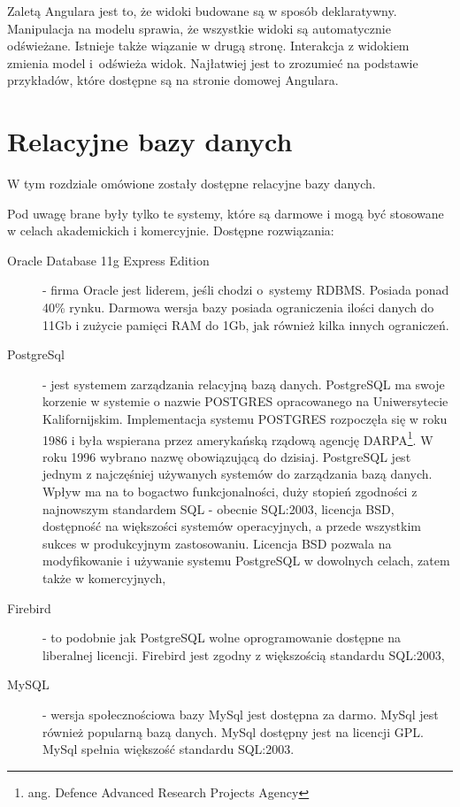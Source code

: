 \documentclass[a4paper,onecolumn,oneside,11pt,wide,floatssmall]{mwrep}
\theoremstyle{definition}
\theoremstyle{plain}%
\theoremstyle{remark}
\begin{document}
Zaletą Angulara jest to, że widoki budowane są w sposób deklaratywny. Manipulacja na modelu sprawia, że wszystkie widoki są automatycznie odświeżane. Istnieje także wiązanie w drugą stronę. Interakcja z widokiem zmienia model \mbox{i odświeża} widok. Najłatwiej jest to zrozumieć na podstawie przykładów, które dostępne są na stronie domowej Angulara.

\section{Relacyjne bazy danych}
W tym rozdziale omówione zostały dostępne relacyjne bazy danych.

Pod uwagę brane były tylko te systemy, które są darmowe i mogą być stosowane w celach akademickich i komercyjnie.
Dostępne rozwiązania:
\begin{description}
  \item [Oracle Database 11g Express Edition] - firma Oracle jest liderem, jeśli chodzi \mbox{o systemy} RDBMS. Posiada ponad 40\% rynku. Darmowa wersja bazy posiada ograniczenia ilości danych do 11Gb i zużycie pamięci RAM do 1Gb, jak również kilka innych ograniczeń. 
  \item [PostgreSql]  \cite{postgreSQLHome} - jest systemem zarządzania relacyjną bazą danych. PostgreSQL ma swoje korzenie w systemie o nazwie POSTGRES opracowanego na Uniwersytecie Kalifornijskim. Implementacja systemu POSTGRES rozpoczęła się w roku 1986 i była wspierana przez amerykańską rządową agencję DARPA\footnote{ang. Defence Advanced Research Projects Agency}. W roku 1996 wybrano nazwę obowiązującą do dzisiaj. PostgreSQL jest jednym z najczęśniej używanych systemów do zarządzania bazą danych. Wpływ ma na to bogactwo funkcjonalności, duży stopień zgodności z najnowszym standardem SQL - obecnie SQL:2003, licencja BSD, dostępność na większości systemów operacyjnych, a przede wszystkim sukces w produkcyjnym zastosowaniu. Licencja BSD pozwala na modyfikowanie i używanie systemu PostgreSQL w dowolnych celach, zatem także w komercyjnych,
  \item [Firebird] - to podobnie jak PostgreSQL wolne oprogramowanie dostępne na liberalnej licencji. Firebird jest zgodny z większością standardu SQL:2003,
  \item [MySQL] - wersja społecznościowa bazy MySql jest dostępna za darmo. MySql jest również popularną bazą danych. MySql dostępny jest na licencji GPL. MySql spełnia większość standardu SQL:2003.
\end{description}
\end{document}
